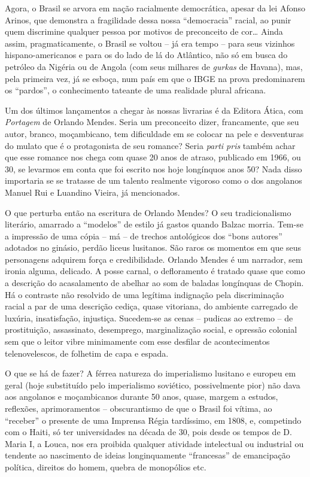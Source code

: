 \documentclass[
  letterpaper,
  DIV=11,
  numbers=noendperiod]{scrreprt}
\begin{document}
Agora, o Brasil se arvora em nação racialmente democrática, apesar da
lei Afonso Arinos, que demonstra a fragilidade dessa nossa
``democracia'' racial, ao punir quem discrimine qualquer pessoa por
motivos de preconceito de cor\ldots{} Ainda assim, pragmaticamente, o
Brasil se voltou -- já era tempo -- para seus vizinhos
hispano-americanos e para os do lado de lá do Atlântico, não só em busca
do petróleo da Nigéria ou de Angola (com seus milhares de \emph{gurkas}
de Havana), mas, pela primeira vez, já se esboça, num país em que o IBGE
na prova predominarem os ``pardos'', o conhecimento tateante de uma
realidade plural africana.

Um dos últimos lançamentos a chegar às nossas livrarias é da Editora
Ática, com \emph{Portagem} de Orlando Mendes. Seria um preconceito
dizer, francamente, que seu autor, branco, moçambicano, tem dificuldade
em se colocar na pele e desventuras do mulato que é o protagonista de
seu romance? Seria \emph{parti pris} também achar que esse romance nos
chega com quase 20 anos de atraso, publicado em 1966, ou 30, se levarmos
em conta que foi escrito nos hoje longínquos anos 50? Nada disso
importaria se se tratasse de um talento realmente vigoroso como o dos
angolanos Manuel Rui e Luandino Vieira, já mencionados.

O que perturba então na escritura de Orlando Mendes? O seu
tradicionalismo literário, amarrado a ``modelos'' de estilo já gastos
quando Balzac morria. Tem-se a impressão de uma cópia -- má -- de
trechos antológicos dos ``bons autores'' adotados no ginásio, perdão
liceus lusitanos. São raros os momentos em que seus personagens adquirem
força e credibilidade. Orlando Mendes é um narrador, sem ironia alguma,
delicado. A posse carnal, o defloramento é tratado quase que como a
descrição do acasalamento de abelhar ao som de baladas longínquas de
Chopin. Há o contraste não resolvido de uma legítima indignação pela
discriminação racial a par de uma descrição cediça, quase vitoriana, do
ambiente carregado de luxúria, insatisfação, injustiça. Sucedem-se as
cenas -- pudicas ao extremo -- de prostituição, assassinato, desemprego,
marginalização social, e opressão colonial sem que o leitor vibre
minimamente com esse desfilar de acontecimentos telenovelescos, de
folhetim de capa e espada.

O que se há de fazer? A férrea natureza do imperialismo lusitano e
europeu em geral (hoje substituído pelo imperialismo soviético,
possivelmente pior) não dava aos angolanos e moçambicanos durante 50
anos, quase, margem a estudos, reflexões, aprimoramentos --
obscurantismo de que o Brasil foi vítima, ao ``receber'' o presente de
uma Imprensa Régia tardíssimo, em 1808, e, competindo com o Haiti, só
ter universidades na década de 30, pois desde os tempos de D. Maria I, a
Louca, nos era proibida qualquer atividade intelectual ou industrial ou
tendente ao nascimento de ideias longinquamente ``francesas'' de
emancipação política, direitos do homem, quebra de monopólios etc.
\end{document}
